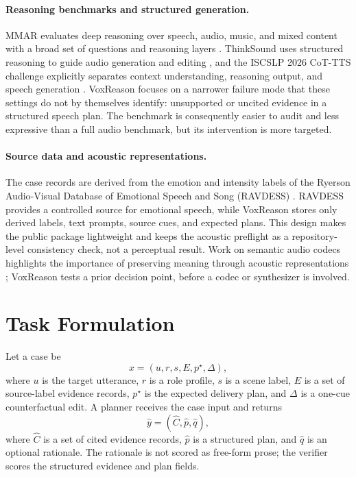 \documentclass{article}
\begin{document}
\paragraph{Reasoning benchmarks and structured generation.}
MMAR evaluates deep reasoning over speech, audio, music, and mixed content with a broad set of questions and reasoning layers \cite{mmar}. ThinkSound uses structured reasoning to guide audio generation and editing \cite{thinksound}, and the ISCSLP 2026 CoT-TTS challenge explicitly separates context understanding, reasoning output, and speech generation \cite{cottts}. VoxReason focuses on a narrower failure mode that these settings do not by themselves identify: unsupported or uncited evidence in a structured speech plan. The benchmark is consequently easier to audit and less expressive than a full audio benchmark, but its intervention is more targeted.

\paragraph{Source data and acoustic representations.}
The case records are derived from the emotion and intensity labels of the Ryerson Audio-Visual Database of Emotional Speech and Song (RAVDESS) \cite{ravdess}. RAVDESS provides a controlled source for emotional speech, while VoxReason stores only derived labels, text prompts, source cues, and expected plans. This design makes the public package lightweight and keeps the acoustic preflight as a repository-level consistency check, not a perceptual result. Work on semantic audio codecs highlights the importance of preserving meaning through acoustic representations \cite{codec}; VoxReason tests a prior decision point, before a codec or synthesizer is involved.

\section{Task Formulation}

Let a case be
\begin{equation}
  x = (u, r, s, E, p^{\star}, \Delta),
\end{equation}
where $u$ is the target utterance, $r$ is a role profile, $s$ is a scene label, $E$ is a set of source-label evidence records, $p^{\star}$ is the expected delivery plan, and $\Delta$ is a one-cue counterfactual edit. A planner receives the case input and returns
\begin{equation}
  \hat{y} = (\hat{C}, \hat{p}, \hat{q}),
\end{equation}
where $\hat{C}$ is a set of cited evidence records, $\hat{p}$ is a structured plan, and $\hat{q}$ is an optional rationale. The rationale is not scored as free-form prose; the verifier scores the structured evidence and plan fields.
\end{document}
